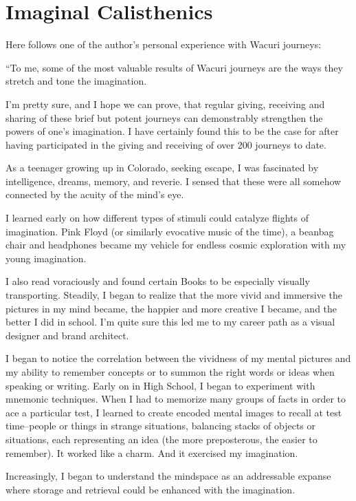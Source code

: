 \documentclass[12pt]{book}
\begin{document}
\section{Imaginal Calisthenics}

Here follows one of the author's personal experience with Wacuri journeys:

``To me, some of the most valuable results of Wacuri journeys are the
ways they stretch and tone the imagination.

I'm pretty sure, and I hope we can prove, that regular giving,
receiving and sharing of these brief but potent journeys can
demonstrably strengthen the powers of one’s imagination. I have
certainly found this to be the case for after having participated in
the giving and receiving of over 200 journeys to date.

As a teenager growing up in Colorado, seeking escape, I was fascinated
by intelligence, dreams, memory, and reverie. I sensed that these were
all somehow connected by the acuity of the mind’s eye.

I learned early on how different types of stimuli could catalyze
flights of imagination. Pink Floyd (or similarly evocative music of
the time), a beanbag chair and headphones became my vehicle for
endless cosmic exploration with my young imagination.

I also read voraciously and found certain Books to be especially
visually transporting. Steadily, I began to realize that the more
vivid and immersive the pictures in my mind became, the happier and
more creative I became, and the better I did in school. I'm quite sure
this led me to my career path as a visual designer and brand
architect.

I began to notice the correlation between the vividness of my mental
pictures and my ability to remember concepts or to summon the right
words or ideas when speaking or writing. Early on in High School, I
began to experiment with mnemonic techniques. When I had to memorize
many groups of facts in order to ace a particular test, I learned to
create encoded mental images to recall at test time--people or things
in strange situations, balancing stacks of objects or situations, each
representing an idea (the more preposterous, the easier to
remember). It worked like a charm. And it exercised my imagination.

Increasingly, I began to understand the mindspace as an addressable
expanse where storage and retrieval could be enhanced with the
imagination.
\end{document}
